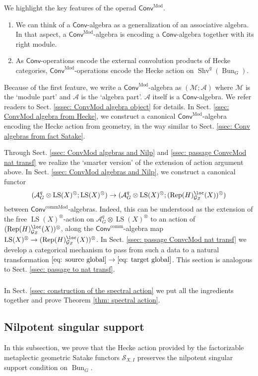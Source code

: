\documentclass[10pt]{amsart}
\newcommand{\sssec}{\subsubsection}
\theoremstyle{remark}
\newcommand{\on}{\operatorname}
\newcommand{\cA}{\mathcal{A}}
\newcommand{\cG}{\mathcal{G}}
\newcommand{\cM}{\mathcal{M}}
\newcommand{\cS}{\mathcal{S}}
\newcommand{\Rep}{\on{Rep}}
\newcommand{\Shv}{\on{Shv}}
\newcommand{\LS}{\on{LS}}
\newcommand{\Bun}{\on{Bun}}
\newcommand{\Conv}{\mathsf{Conv}}
\newcommand{\Convcomm}{\mathsf{Conv}^{\on{comm}}}
\newcommand{\ConvMod}{\mathsf{Conv}^{\on{Mod}}}
\newcommand{\ConvcMod}{\mathsf{Conv}^{\on{commMod}}}
\begin{document}
We highlight the key features of the operad $\ConvMod$.
\begin{enumerate}
    \item We can think of a $\Conv$-algebra as a generalization of an associative algebra. In that aspect, a $\ConvMod$-algebra is encoding a $\Conv$-algebra together with its right module.
    \item As $\Conv$-operations encode the external convolution products of Hecke categories, $\ConvMod$-operations encode the Hecke action on $\Shv^q(\Bun_G)$.
\end{enumerate}

Because of the first feature, we write a $\ConvMod$-algebra as $(\cM;\cA)$ where $\cM$ is the `module part' and $\cA$ is the `algebra part'. $\cA$ itself is a $\Conv$-algebra. We refer readers to Sect. \ref{sssec: ConvMod algebra object} for details. In Sect. \ref{ssec: ConvMod algebra from Hecke}, we construct a canonical $\ConvMod$-algebra encoding the Hecke action from geometry, in the way similar to  Sect. \ref{ssec: Conv algebras from fact Satake}.
\medskip

 Through Sect. \ref{ssec: ConvMod algebras and Nilp} and \ref{ssec: passage ConvcMod nat transf} we realize the `smarter version' of the extension of action argument above. In Sect. \ref{ssec: ConvMod algebras and Nilp}, we construct a canonical functor 
 \[(\cA^q_G\otimes\LS(X)^{\otimes};\LS(X)^{\otimes})\rightarrow (\cA^q_G\otimes\LS(X)^{\otimes};(\Rep(H)^{\loc}_{\cG_Z}(X))^{\otimes})\]
 between $\ConvcMod$-algebras. Indeed, this can be understood as the extension of the free $\LS(X)^{\otimes}$-action on $\cA^q_G\otimes\LS(X)^{\otimes}$ to an action of $(\Rep(H)^{\loc}_{\cG_Z}(X))^{\otimes}$, along the $\Convcomm$-algebra map $\LS(X)^{\otimes}\rightarrow (\Rep(H)^{\loc}_{\cG_Z}(X))^{\otimes}$. In Sect. \ref{ssec: passage ConvcMod nat transf} we develop a categorical mechanism to pass from such a data to a natural transformation $\eqref{eq: source global}\rightarrow\eqref{eq: target global}$. This section is analogous to Sect. \ref{ssec: passage to nat transf}.

 \sssec{}
 In Sect. \ref{ssec: construction of the spectral action} we put all the ingredients together and prove Theorem \ref{thm: spectral action}.





\subsection{Nilpotent singular support}\label{ssec: nilpotent singular support}
In this subsection, we prove that the Hecke action provided by the factorizable metaplectic geometric Satake functors $\cS_{X,I}$
preserves the nilpotent singular support condition on $\Bun_G$.
\end{document}

